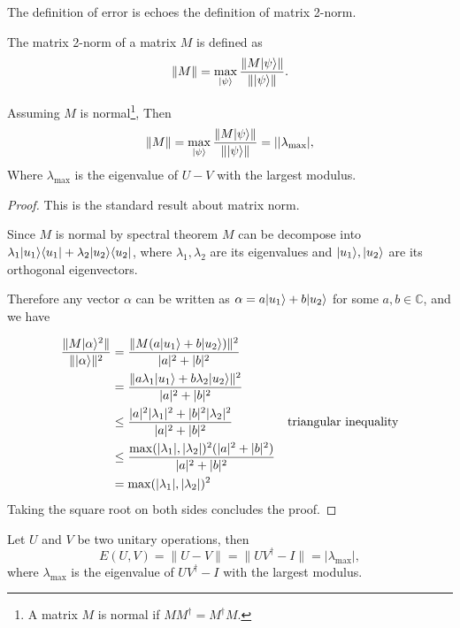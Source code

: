 The definition of error is echoes the definition of matrix 2-norm.

\begin{definition}
	The matrix 2-norm of a matrix $M$ is defined as 
	$$
	\| M \| = \max_{|\psi\rangle} \frac{\| M |\psi\rangle \|}{\| |\psi\rangle \|}.
	$$
\end{definition}

\begin{proposition}
	Assuming $M$ is normal\footnote{A matrix $M$ is normal if $M M^\dagger = M^\dagger M$.}, 
	Then
	$$
	\| M \| = \max_{|\psi\rangle} \frac{\| M |\psi\rangle \|}{\| |\psi\rangle \|} = ||\lambda_{\max}|,
	$$
	Where $\lambda_{\max}$ is the eigenvalue of $U - V$ with the largest modulus.
\end{proposition}

\begin{proof}
	This is the standard result about matrix norm. 

	Since $M$ is normal by spectral theorem $M$ can be decompose into $\lambda_1|u_1\rangle\langle u_1| + \lambda_2 |u_2\rangle \langle u_2|$, where $\lambda_1, \lambda_2$ are its eigenvalues and $|u_1\rangle, |u_2\rangle$ are its orthogonal eigenvectors.

	Therefore any vector $\alpha$ can be written as $\alpha = a |u_1\rangle + b |u_2\rangle$ for some $a, b \in \mathbb{C}$, and we have

	\begin{align*}
		\frac{\|M |\alpha\rangle^2 \|}{\| |\alpha\rangle\|^2} 
				 &= \frac{\|M (a |u_1\rangle + b |u_2\rangle)\|^2}{|a|^2 + |b|^2} 
				 &\\ 
				 & = \frac{\|a \lambda_1 |u_1\rangle + b \lambda_2 |u_2\rangle\|^2}{|a|^2 + |b|^2} 
				 &\\ 
				 & \leq \frac{ |a|^2 |\lambda_1|^2 + |b|^2 |\lambda_2|^2}{|a|^2 + |b|^2}
				 & \text{triangular inequality}\\ 
				 & \leq \frac{\max(|\lambda_1|, |\lambda_2|)^2 (|a|^2 + |b|^2)}{|a|^2 + |b|^2}
				 &\\ 
				 & = \max(|\lambda_1|, |\lambda_2|)^2 &
	\end{align*}
	Taking the square root on both sides concludes the proof.
\end{proof}

\begin{corollary}\label{cor:computation-of-error}
	Let $U$ and $V$ be two unitary operations, then 
	$$
	E(U, V) = \| U - V \| = \| UV^\dagger - I \| = |\lambda_{\max}|,
	$$
	where $\lambda_{\max}$ is the eigenvalue of $UV^\dagger - I$ with the largest modulus.
\end{corollary}


